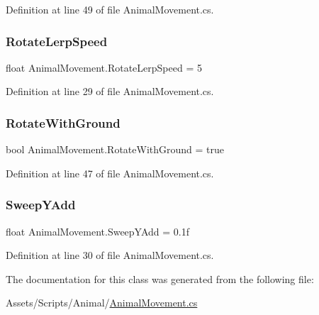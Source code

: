 Definition at line 49 of file Animal\+Movement.\+cs.

\mbox{\label{class_animal_movement_a518271696ae1161577cf3999fa0ae93c}} 
\subsubsection{\texorpdfstring{Rotate\+Lerp\+Speed}{RotateLerpSpeed}}
{\footnotesize\ttfamily float Animal\+Movement.\+Rotate\+Lerp\+Speed = 5}



Definition at line 29 of file Animal\+Movement.\+cs.

\mbox{\label{class_animal_movement_a82027772be00ed9b175e7a65848d88a2}} 
\subsubsection{\texorpdfstring{Rotate\+With\+Ground}{RotateWithGround}}
{\footnotesize\ttfamily bool Animal\+Movement.\+Rotate\+With\+Ground = true}



Definition at line 47 of file Animal\+Movement.\+cs.

\mbox{\label{class_animal_movement_ad8807562e391a924199f420eed40e6ba}} 
\subsubsection{\texorpdfstring{Sweep\+Y\+Add}{SweepYAdd}}
{\footnotesize\ttfamily float Animal\+Movement.\+Sweep\+Y\+Add = 0.\+1f}



Definition at line 30 of file Animal\+Movement.\+cs.



The documentation for this class was generated from the following file\+:\begin{DoxyCompactItemize}
\item 
Assets/\+Scripts/\+Animal/\mbox{\hyperlink{_animal_movement_8cs}{Animal\+Movement.\+cs}}\end{DoxyCompactItemize}

